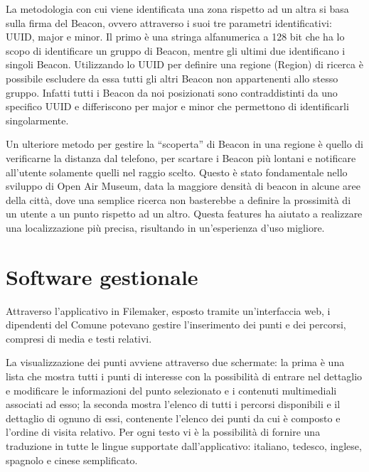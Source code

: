 La metodologia con cui viene identificata una zona rispetto ad un altra si basa sulla firma del Beacon, ovvero attraverso i suoi tre parametri identificativi: UUID, major e minor. Il primo è una stringa alfanumerica a 128 bit che ha lo scopo di identificare un gruppo di Beacon, mentre gli ultimi due identificano i singoli Beacon. Utilizzando lo UUID per definire una regione (Region) di ricerca è possibile escludere da essa tutti gli altri Beacon non appartenenti allo stesso gruppo. Infatti tutti i Beacon da noi posizionati sono contraddistinti da uno specifico UUID e differiscono per major e minor che permettono di identificarli singolarmente. \vspace{5mm}

Un ulteriore metodo per gestire la “scoperta” di Beacon in una regione è quello di verificarne la distanza dal telefono, per scartare i Beacon più lontani e notificare all’utente solamente quelli nel raggio scelto. Questo è stato fondamentale nello sviluppo di Open Air Museum, data la maggiore densità di beacon in alcune aree della città, dove una semplice ricerca non basterebbe a definire la prossimità di un utente a un punto rispetto ad un altro. Questa features ha aiutato a realizzare una localizzazione più precisa, risultando in un’esperienza d’uso migliore.

\section{Software gestionale}\vspace{5mm}

	Attraverso l’applicativo in Filemaker, esposto tramite un’interfaccia web, i dipendenti del Comune potevano gestire l’inserimento dei punti e dei percorsi, compresi di media e testi relativi. \vspace{5mm}
	
La visualizzazione dei punti avviene attraverso due schermate: la prima è una lista che mostra tutti i punti di interesse con la possibilità di entrare nel dettaglio e modificare le informazioni del punto selezionato e i contenuti multimediali associati ad esso; la seconda mostra l'elenco di tutti i percorsi disponibili e il dettaglio di ognuno di essi, contenente l'elenco dei punti da cui è composto e l'ordine di visita relativo. Per ogni testo vi è la possibilità di fornire una traduzione in tutte le lingue supportate dall'applicativo: italiano, tedesco, inglese, spagnolo e cinese semplificato.\vspace{5mm}

